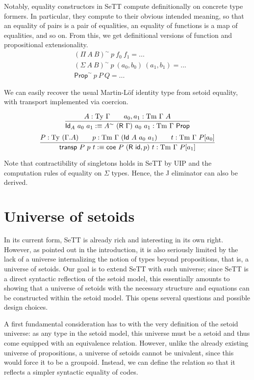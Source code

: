 \documentclass{easychair}
\newcommand{\GG}{\Gamma}
\newcommand{\R}{\textsf{R}}
\newcommand{\Id}{\textsf{Id}}
\newcommand{\coe}{\textsf{coe}}
\newcommand{\tyj}[2]{#2 : \Ty\ #1}
\newcommand{\tmj}[3]{#2 : \Tm\ #1\ #3}
\newcommand{\Prop}{\textsf{Prop}}
\newcommand{\Ty}{\mathrm{Ty}}
\newcommand{\Tm}{\mathrm{Tm}}
\begin{document}
Notably, equality constructors in SeTT compute definitionally on concrete type
formers. In particular, they compute to their obvious intended meaning, so that
an equality of pairs is a pair of equalities, an equality of functions is a map
of equalities, and so on. From this, we get definitional versions of function
and propositional extensionality.
%
\begin{align*}
  & (\Pi\ A\ B)^\sim\ p\ f_0\ f_1 = ... \\
  & (\Sigma\ A\ B)^\sim\ p\ (a_0, b_0)\ (a_1, b_1) = ... \\
  & \Prop^\sim\ p\ P\ Q = ...
\end{align*}

We can easily recover the usual Martin-L\"of identity type from setoid equality,
with transport implemented via coercion.

\[
\infer{
  \textsf{Id}_A\ a_0\ a_1 :\equiv A^{\sim}\ (\R\ \GG)\ a_0\ a_1 : \Tm\ \GG\ \Prop
}{
  \tyj{\GG}{A} \qquad \tmj{\GG}{a_0, a_1}{A}
}
\]
\[
\infer{
  \textsf{transp}\ P\ p\ t :\equiv
    \coe\ P\ (\textsf{R}\ \textsf{id} , p)\ t : \Tm\ \GG\ P[a_1]
}{
  P : \Ty\ (\GG . A)
  \qquad
  p : \Tm\ \GG\ (\Id\ A\ a_0\ a_1)
  \qquad
  t : \Tm\ \GG\ P[a_0]
}
\]

Note that contractibility of singletons holds in SeTT by UIP and the computation
rules of equality on $\Sigma$ types. Hence, the J eliminator can also be
derived.

\section{Universe of setoids}

In its current form, SeTT is already rich and interesting in its own right.
However, as pointed out in the introduction, it is also seriously limited by the
lack of a universe internalizing the notion of types beyond propositions, that
is, a universe of setoids. Our goal is to extend SeTT with such universe; since
SeTT is a direct syntactic reflection of the setoid model, this essentially
amounts to showing that a universe of setoids with the necessary structure and
equations can be constructed within the setoid model. This opens several
questions and possible design choices.

A first fundamental consideration has to with the very definition of the setoid
universe: as any type in the setoid model, this universe must be a setoid and
thus come equipped with an equivalence relation. However, unlike the already
existing universe of propositions, a universe of setoids cannot be univalent,
since this would force it to be a groupoid. Instead, we can define the relation
so that it reflects a simpler syntactic equality of codes.
\end{document}
